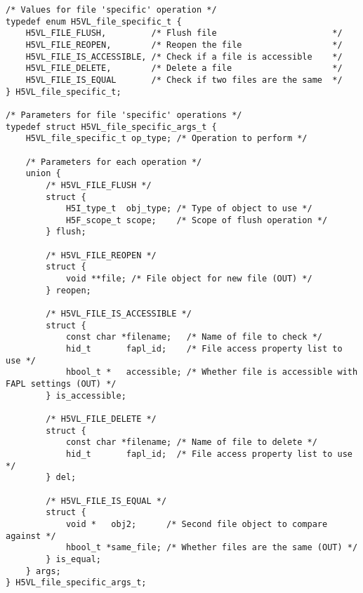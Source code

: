 \begin{lstlisting}
/* Values for file 'specific' operation */
typedef enum H5VL_file_specific_t {
    H5VL_FILE_FLUSH,         /* Flush file                       */
    H5VL_FILE_REOPEN,        /* Reopen the file                  */
    H5VL_FILE_IS_ACCESSIBLE, /* Check if a file is accessible    */
    H5VL_FILE_DELETE,        /* Delete a file                    */
    H5VL_FILE_IS_EQUAL       /* Check if two files are the same  */
} H5VL_file_specific_t;

/* Parameters for file 'specific' operations */
typedef struct H5VL_file_specific_args_t {
    H5VL_file_specific_t op_type; /* Operation to perform */

    /* Parameters for each operation */
    union {
        /* H5VL_FILE_FLUSH */
        struct {
            H5I_type_t  obj_type; /* Type of object to use */
            H5F_scope_t scope;    /* Scope of flush operation */
        } flush;

        /* H5VL_FILE_REOPEN */
        struct {
            void **file; /* File object for new file (OUT) */
        } reopen;

        /* H5VL_FILE_IS_ACCESSIBLE */
        struct {
            const char *filename;   /* Name of file to check */
            hid_t       fapl_id;    /* File access property list to use */
            hbool_t *   accessible; /* Whether file is accessible with FAPL settings (OUT) */
        } is_accessible;

        /* H5VL_FILE_DELETE */
        struct {
            const char *filename; /* Name of file to delete */
            hid_t       fapl_id;  /* File access property list to use */
        } del;

        /* H5VL_FILE_IS_EQUAL */
        struct {
            void *   obj2;      /* Second file object to compare against */
            hbool_t *same_file; /* Whether files are the same (OUT) */
        } is_equal;
    } args;
} H5VL_file_specific_args_t;
\end{lstlisting}

